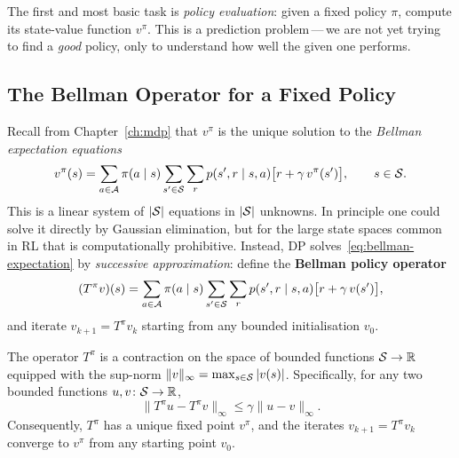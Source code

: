 The first and most basic task is \emph{policy evaluation}: given a fixed policy $\pi$, compute its state-value function $v^\pi$.  This is a prediction problem\,---\,we are not yet trying to find a \emph{good} policy, only to understand how well the given one performs.

\subsection*{The Bellman Operator for a Fixed Policy}

Recall from Chapter~\ref{ch:mdp} that $v^\pi$ is the unique solution to the \emph{Bellman expectation equations}
\begin{equation}
\label{eq:bellman-expectation}
v^\pi(s) = \sum_{a \in \mathcal{A}} \pi(a \mid s) \sum_{s' \in \mathcal{S}} \sum_{r} p(s', r \mid s, a)\bigl[r + \gamma\, v^\pi(s')\bigr], \qquad s \in \mathcal{S}.
\end{equation}
This is a linear system of $|\mathcal{S}|$ equations in $|\mathcal{S}|$ unknowns.  In principle one could solve it directly by Gaussian elimination, but for the large state spaces common in RL that is computationally prohibitive.  Instead, DP solves~\eqref{eq:bellman-expectation} by \emph{successive approximation}: define the \textbf{Bellman policy operator}
\begin{equation}
\label{eq:bellman-operator}
(T^\pi v)(s) = \sum_{a \in \mathcal{A}} \pi(a \mid s) \sum_{s' \in \mathcal{S}} \sum_{r} p(s', r \mid s, a)\bigl[r + \gamma\, v(s')\bigr],
\end{equation}
and iterate $v_{k+1} = T^\pi v_k$ starting from any bounded initialisation $v_0$.

\begin{theorem}[Contraction of $T^\pi$]
\label{thm:contraction}
The operator $T^\pi$ is a contraction on the space of bounded functions $\mathcal{S} \to \mathbb{R}$ equipped with the sup-norm $\|v\|_\infty = \max_{s \in \mathcal{S}}|v(s)|$.  Specifically, for any two bounded functions $u, v \colon \mathcal{S} \to \mathbb{R}$,
\[
\|T^\pi u - T^\pi v\|_\infty \le \gamma \|u - v\|_\infty.
\]
Consequently, $T^\pi$ has a unique fixed point $v^\pi$, and the iterates $v_{k+1} = T^\pi v_k$ converge to $v^\pi$ from any starting point $v_0$.
\end{theorem}

